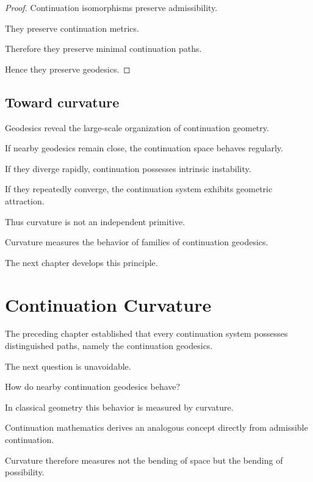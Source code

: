 \documentclass[13pt,openany]{book}
\theoremstyle{plain}
\theoremstyle{definition}
\begin{document}
\begin{proof}

Continuation isomorphisms preserve admissibility.

They preserve continuation metrics.

Therefore they preserve minimal continuation paths.

Hence they preserve geodesics.

\end{proof}


\section{Toward curvature}

Geodesics reveal the large-scale organization of continuation geometry.

If nearby geodesics remain close, the continuation space behaves regularly.

If they diverge rapidly, continuation possesses intrinsic instability.

If they repeatedly converge, the continuation system exhibits geometric attraction.

Thus curvature is not an independent primitive.

Curvature measures the behavior of families of continuation geodesics.

The next chapter develops this principle.

\chapter{Continuation Curvature}

The preceding chapter established that every continuation system possesses distinguished paths, namely the continuation geodesics.

The next question is unavoidable.

How do nearby continuation geodesics behave?

In classical geometry this behavior is measured by curvature.

Continuation mathematics derives an analogous concept directly from admissible continuation.

Curvature therefore measures not the bending of space but the bending of possibility.

\end{document}
